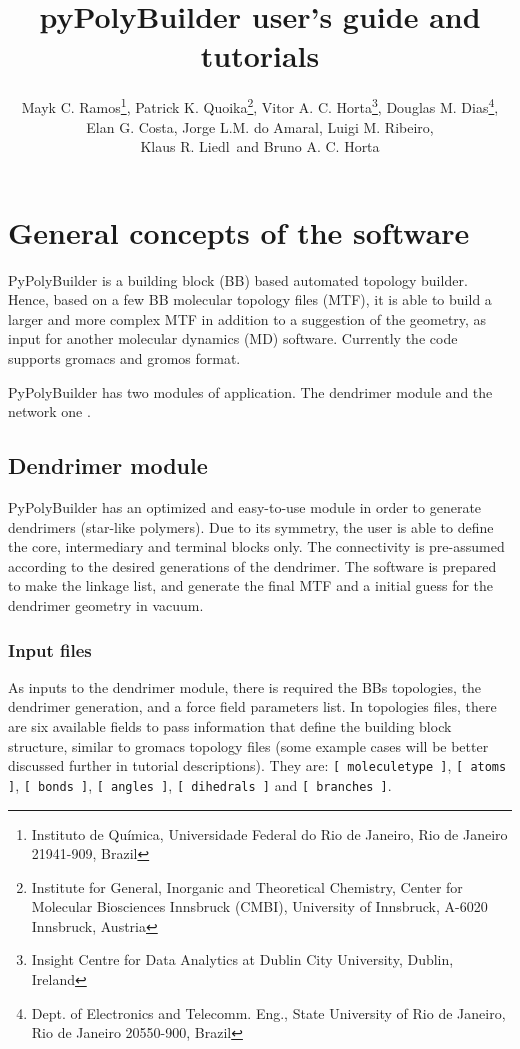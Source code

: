 \documentclass[12pt]{article}
\title{pyPolyBuilder user's guide and tutorials}
\author{
	Mayk C. Ramos\thanks{Instituto de Qu\'imica, Universidade Federal do Rio de Janeiro, Rio de Janeiro 21941-909, Brazil},
	Patrick K. Quoika\thanks{Institute for General, Inorganic and Theoretical Chemistry, Center for Molecular Biosciences Innsbruck (CMBI), University of Innsbruck, A-6020 Innsbruck, Austria}, 
	Vitor A. C. Horta\thanks{Insight Centre for Data Analytics at Dublin City University, Dublin, Ireland},
	Douglas M. Dias\thanks{Dept. of Electronics and Telecomm. Eng., State University of Rio de Janeiro, Rio de Janeiro 20550-900, Brazil},\\
	Elan G. Costa\samethanks{},
	Jorge L.M. do Amaral\samethanks{},
	Luigi M. Ribeiro\samethanks{},\\
	Klaus R. Liedl\samethanks[2]\  and 
	Bruno A. C. Horta\samethanks[1]
}
\begin{document}
\maketitle

\begin{abstract}
\end{abstract}

\tableofcontents

\renewcommand{\baselinestretch}{1.5}
\normalsize

\section{General concepts of the software}

PyPolyBuilder is a building block (BB) based automated topology builder.
Hence, based on a few BB molecular topology files (MTF), it is able to build a larger and more complex MTF in addition to a suggestion of the geometry, as input for another molecular dynamics (MD) software.
Currently the code supports gromacs and gromos format.

PyPolyBuilder has two modules of application. The dendrimer module and the network one .

\subsection{Dendrimer module}
PyPolyBuilder has an optimized and easy-to-use module in order to generate dendrimers (star-like polymers).
Due to its symmetry, the user is able to define the core, intermediary and terminal blocks only.
The connectivity is pre-assumed according to the desired generations of the dendrimer.
The software is prepared to make the linkage list, and generate the final MTF and a initial guess for the dendrimer geometry in vacuum.

\subsubsection{Input files}
\label{sec:DENDinputFiles}
As inputs to the dendrimer module, there is required the BBs topologies, the dendrimer generation, and a force field parameters list.
In topologies files, there are six available fields to pass information that define the building block structure, similar to gromacs topology files (some example cases will be better discussed further in tutorial descriptions).
They are: \texttt{[ moleculetype ]}, \texttt{[ atoms ]}, \texttt{[ bonds ]}, \texttt{[ angles ]}, \texttt{[ dihedrals ]} and \texttt{[ branches ]}.
\end{document}

